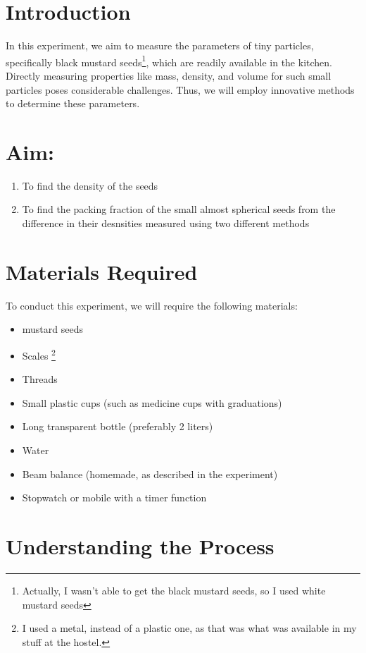 \documentclass[twocolumn,11pt]{article}
\begin{document}
\section{Introduction}
In this experiment, we aim to measure the parameters of tiny particles, specifically black mustard seeds\footnote{Actually, I wasn't able to get the black mustard seeds, so I used white mustard seeds}, which are readily available in the kitchen. Directly measuring properties like mass, density, and volume for such small particles poses considerable challenges. Thus, we will employ innovative methods to determine these parameters.
\section{Aim:}
\begin{enumerate}
    \item To find the density of the seeds
    \item To find the packing fraction of the small almost spherical seeds from the difference in their desnsities measured using two different methods
\end{enumerate}
\section{Materials Required}

To conduct this experiment, we will require the following materials:
\begin{itemize}
    \item mustard seeds
    \item Scales \footnote{I used a metal, instead of a plastic one, as that was what was available in my stuff at the hostel.}
    \item Threads
    \item Small plastic cups (such as medicine cups with graduations)
    \item Long transparent bottle (preferably 2 liters)
    \item Water
    \item Beam balance (homemade, as described in the experiment)
    \item Stopwatch or mobile with a timer function
\end{itemize}

\section{Understanding the Process}
\end{document}
